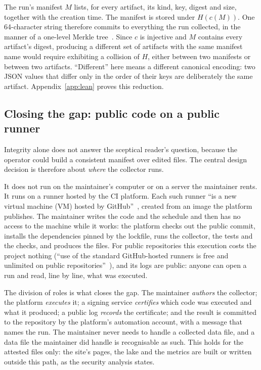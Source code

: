 The run's manifest $M$ lists, for every artifact, its kind, key, digest and size, together with the creation time. The manifest is stored under $H(c(M))$. One 64-character string therefore commits to everything the run collected, in the manner of a one-level Merkle tree~\citep{merkle1988signature}. Since $c$ is injective and $M$ contains every artifact's digest, producing a different set of artifacts with the same manifest name would require exhibiting a collision of $H$, either between two manifests or between two artifacts. ``Different'' here means a different canonical encoding: two JSON values that differ only in the order of their keys are deliberately the same artifact. Appendix~\ref{app:lean} proves this reduction.

\subsection{Closing the gap: public code on a public runner}
\label{sec:attestation}

Integrity alone does not answer the sceptical reader's question, because the operator could build a consistent manifest over edited files. The central design decision is therefore about \emph{where} the collector runs.

It does not run on the maintainer's computer or on a server the maintainer rents. It runs on a runner hosted by the CI platform. Each such runner ``is a new virtual machine (VM) hosted by GitHub''~\citep{github-hosted-runners}, created from an image the platform publishes. The maintainer writes the code and the schedule and then has no access to the machine while it works: the platform checks out the public commit, installs the dependencies pinned by the lockfile, runs the collector, the tests and the checks, and produces the files. For public repositories this execution costs the project nothing (``use of the standard GitHub-hosted runners is free and unlimited on public repositories''~\citep{github-runners-reference}), and its logs are public: anyone can open a run and read, line by line, what was executed.

The division of roles is what closes the gap. The maintainer \emph{authors} the collector; the platform \emph{executes} it; a signing service \emph{certifies} which code was executed and what it produced; a public log \emph{records} the certificate; and the result is committed to the repository by the platform's automation account, with a message that names the run. The maintainer never needs to handle a collected data file, and a data file the maintainer did handle is recognisable as such. This holds for the attested files only: the site's pages, the lake and the metrics are built or written outside this path, as the security analysis states.

